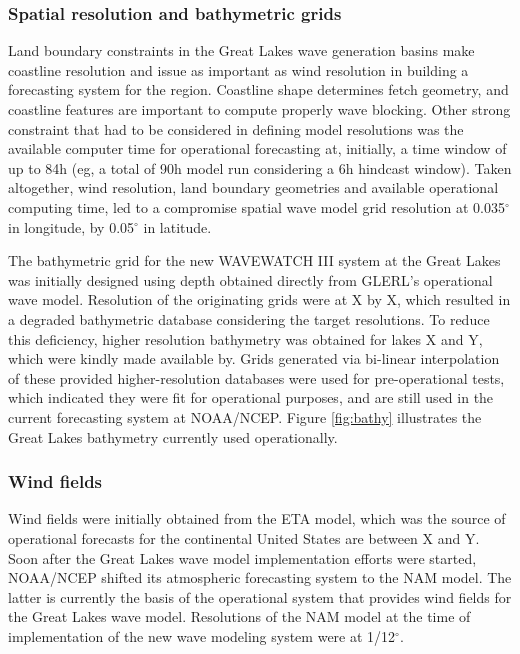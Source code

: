 \subsubsection{Spatial resolution and bathymetric grids}

Land boundary constraints in the Great Lakes wave generation basins make
coastline resolution and issue as important as wind resolution in building a
forecasting system for the region. Coastline shape determines fetch geometry,
and coastline features are important to compute properly wave blocking. Other
strong constraint that had to be considered in defining model resolutions was
the available computer time for operational forecasting at, initially, a time
window of up to 84h (eg, a total of 90h model run considering a 6h hindcast
window). Taken altogether, wind resolution, land boundary geometries and
available operational computing time, led to a compromise spatial wave model
grid resolution at 0.035$^\circ$ in longitude, by 0.05$^{\circ}$ in latitude.

The bathymetric grid for the new WAVEWATCH III system at the Great Lakes was
initially designed using depth obtained directly from GLERL's operational wave
model. Resolution of the originating grids were at X by X, which resulted in a
degraded bathymetric database considering the target resolutions. To reduce this
deficiency, higher resolution bathymetry was obtained for lakes X and Y, which
were kindly made available by. Grids generated via bi-linear interpolation of
these provided higher-resolution databases were used for pre-operational tests,
which indicated they were fit for operational purposes, and are still used in
the current forecasting system at NOAA/NCEP. Figure \ref{fig:bathy} illustrates
the Great Lakes bathymetry currently used operationally.

\subsubsection{Wind fields}

Wind fields were initially obtained from the ETA model, which was the source of
operational forecasts for the continental United States are between X and Y.
Soon after the Great Lakes wave model implementation efforts were started,
NOAA/NCEP shifted its atmospheric forecasting system to the NAM model. The
latter is currently the basis of the operational system that provides wind
fields for the Great Lakes wave model. Resolutions of the NAM model at the time
of implementation of the new wave modeling system were at 1/12$^{\circ}$. 


